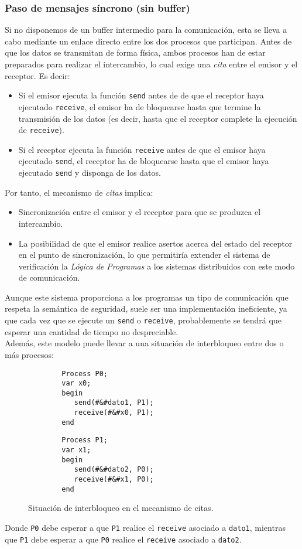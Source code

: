 \subsubsection{Paso de mensajes síncrono (sin buffer)}
Si no disponemos de un buffer intermedio para la comunicación, esta se lleva a cabo mediante un enlace directo entre los dos procesos que participan. Antes de que los datos se transmitan de forma física, ambos procesos han de estar preparados para realizar el intercambio, lo cual exige una \textit{cita} entre el emisor y el receptor. Es decir:
\begin{itemize}
    \item Si el emisor ejecuta la función \verb|send| antes de de que el receptor haya ejecutado \verb|receive|, el emisor ha de bloquearse hasta que termine la transmisión de los datos (es decir, hasta que el receptor complete la ejecución de \verb|receive|).
    \item Si el receptor ejecuta la función \verb|receive| antes de que el emisor haya ejecutado \verb|send|, el receptor ha de bloquearse hasta que el emisor haya ejecutado \verb|send| y disponga de los datos.
\end{itemize}
Por tanto, el mecanismo de \textit{citas} implica:
\begin{itemize}
    \item Sincronización entre el emisor y el receptor para que se produzca el intercambio.
    \item La posibilidad de que el emisor realice asertos acerca del estado del receptor en el punto de sincronización, lo que permitiría extender el sistema de verificación la \textit{Lógica de Programas} a los sistemas distribuidos con este modo de comunicación.
\end{itemize}
Aunque este sistema proporciona a los programas un tipo de comunicación que respeta la semántica de seguridad, suele ser una implementación ineficiente, ya que cada vez que se ejecute un \verb|send| o \verb|receive|, probablemente se tendrá que esperar una cantidad de tiempo no despreciable.\\

Además, este modelo puede llevar a una situación de interbloqueo entre dos o más procesos:
\begin{figure}[H]
    \centering
\setlength{\columnsep}{1cm}
\begin{multicols}{2}
    \begin{verbatim}
        Process P0;
        var x0;
        begin
           send(#&#dato1, P1);
           receive(#&#x0, P1);
        end
    \end{verbatim}
    \begin{verbatim}
        Process P1;
        var x1;
        begin
           send(#&#dato2, P0);
           receive(#&#x1, P0);
        end
    \end{verbatim}
\end{multicols}
\caption{Situación de interbloqueo en el mecanismo de citas.}    
\end{figure}
Donde \verb|P0| debe esperar a que \verb|P1| realice el \verb|receive| asociado a \verb|dato1|, mientras que \verb|P1| debe esperar a que \verb|P0| realice el \verb|receive| asociado a \verb|dato2|.

